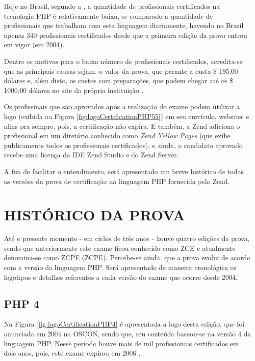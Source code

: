 Hoje no Brasil, segundo a , a
quantidade de profissionais certificados na tecnologia \acs{PHP} é relativamente
baixa, se comparado a quantidade de profissionais que trabalham com esta
linguagem diariamente, havendo no Brasil apenas 340 profissionais certificados
desde que a primeira edição da prova entrou em vigor (em 2004).

Dentre os motivos para o baixo número de profissionais certificados, acredita-se
que as principais causas sejam: o valor da prova, que perante a
 custa \$ 195,00 dólares e, além disto,
os custos com preparações, que podem chegar até os \$ 1000,00 dólares no site da
própria instituição \cite{websiteZendOnlineTraining}.

Os profissinais que são aprovados após a realização do exame podem utilizar a
logo (exibida na Figura \ref{fig:logoCertificationPHP55}) em seu currículo,
websites e afins pra sempre, pois, a certificação não expira. E também, a Zend
adiciona o profissional em um diretório conhecido como \textit{Zend Yellow
Pages} (que exibe publicamente todos os profissionais certificados), e ainda, o
candidato aprovado recebe uma licença da \acs{IDE} \acs{Zend Studio} e do 
\acs{Zend Server}.

A fim de facilitar o entendimento, será apresentado um breve histórico
de todas as versões da prova de certificação na linguagem \acs{PHP} fornecida
pela \acs{Zend}.

\section{HISTÓRICO DA PROVA}

Até o presente momento - em ciclos de três anos - houve quatro edições da
prova, sendo que anteriormente este exame ficou conhecido como \ac{ZCE} e
atualmente denomina-se como \acl{ZCPE} (\acs{ZCPE}). Percebe-se ainda, que a
prova evolui de acordo com a versão da linguagem \acs{PHP}. Será apresentado de
maneira cronológica os logotipos e detalhes referentes a cada versão do exame 
que ocorre desde 2004.

\subsection{PHP 4}

Na Figura \ref{fig:logoCertificationPHP4} é apresentada a logo desta edição, que
foi anunciada em 2004 na \ac{OSCON}, sendo que, seu conteúdo baseou-se na versão
4 da linguagem \acs{PHP}. Nesse período houve mais de mil profissionais
certificados em dois anos, pois, este exame expirou em 2006
\cite{entrevistaAriZCEBrasil}.

